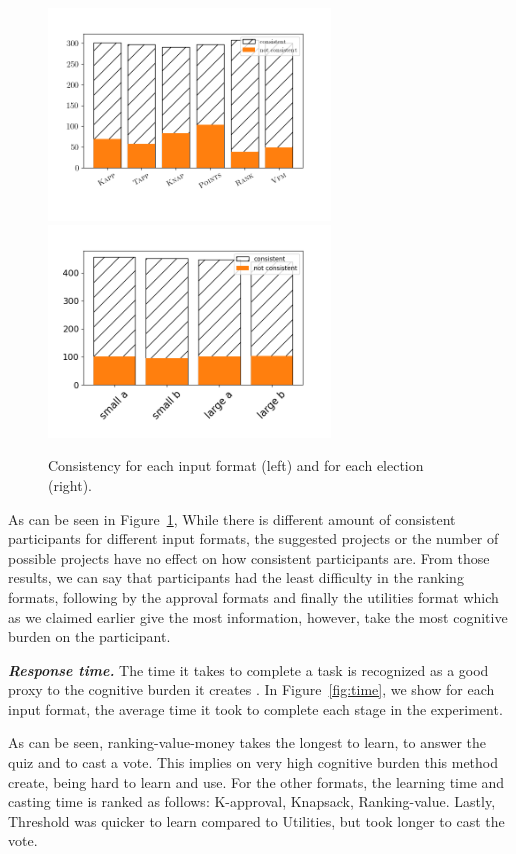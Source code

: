 \documentclass[10pt]{article}
\newcommand{\kibitz}[2]{\ifnum\Comments=1{\color{#1}{#2}}\fi}
\newcommand{\gb}[1]{\kibitz{green}{[GB:#1]}}
\begin{document}
\begin{figure}[!htbp]
\begin{center}
\includegraphics[width=7.5cm]{experiment/format_consistency.png}
\includegraphics[width=7.5cm]{experiment/election_consistency.png}
\caption{Consistency for each input  format (left) and for each election (right).
}\label{fig:consistency}
\end{center}
\end{figure}

As can be seen in Figure~\ref{fig:consistency}, While there is different amount of consistent participants for different input formats, the suggested projects or the number of possible projects have no effect on how consistent participants are. From those results, we can say that participants had the least difficulty in the ranking formats, following by the approval formats and finally the utilities format which as we claimed earlier give the most information, however, take the most cognitive burden on the participant.

\emph{\textbf{Response time.}} 
The time it takes to complete a task is recognized as a good proxy to the cognitive burden it creates \cite{rauterberg1992method}. 
In Figure~\ref{fig:time}, we show for each input format, the average time it took to complete each stage in the experiment.

As can be seen, ranking-value-money takes the longest to learn, to answer the quiz and to cast a vote. This implies on very high cognitive burden this method create, being hard to learn and use.
For the other formats, the learning time and casting time is ranked as follows: K-approval, Knapsack, Ranking-value. Lastly, Threshold was quicker to learn compared to Utilities, but took longer to cast the vote.
\end{document}

